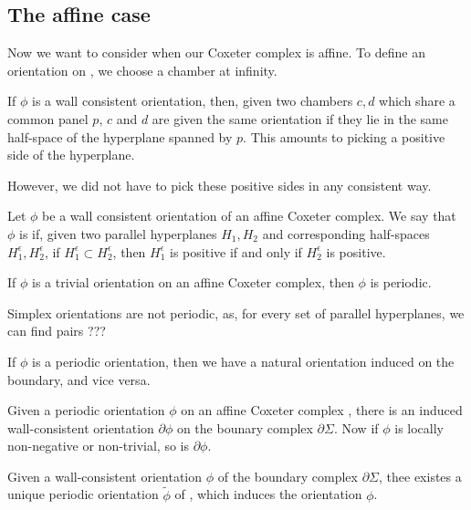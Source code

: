 \documentclass[11pt]{article}
\begin{document}
\subsection{The affine case}

Now we want to consider when our Coxeter complex \sg is affine. To define an orientation on \sg, we choose a chamber at infinity.

If $\phi$ is a wall consistent orientation, then, given two chambers $c,d$ which share a common panel $p$, $c$ and $d$ are given the same orientation if they lie in the same half-space of the hyperplane spanned by $p$. This amounts to picking a positive side of the hyperplane.

However, we did not have to pick these positive sides in any consistent way. 

\begin{definition}
    Let $\phi$ be a wall consistent orientation of an affine Coxeter complex. We say that $\phi$ is  if, given two parallel hyperplanes $H_1,H_2$ and corresponding half-spaces $H_1^{\epsilon},H_2^{\epsilon}$, if $H_1^{\epsilon}\subset H_2^{\epsilon}$, then $H_1^{\epsilon}$ is positive if and only if $H_2^{\epsilon}$ is positive. 
\end{definition}

\begin{example}
    If $\phi$ is a trivial orientation on an affine Coxeter complex, then $\phi$ is periodic. 
\end{example}

\begin{example}
    Simplex orientations are not periodic, as, for every set of parallel hyperplanes, we can find pairs ???
\end{example}

If $\phi$ is a periodic orientation, then we have a natural orientation induced on the boundary, and vice versa. 

\begin{lemma}
    Given a periodic orientation $\phi$ on an affine Coxeter complex \sg, there is an induced wall-consistent orientation $\partial\phi$ on the bounary complex $\partial\Sigma$. Now if $\phi$ is locally non-negative or non-trivial, so is $\partial\phi$. 
\end{lemma}

\begin{lemma}
    Given a wall-consistent orientation $\phi$ of the boundary complex $\partial\Sigma$, thee existes a unique periodic orientation $\tilde{\phi}$ of \sg, which induces the orientation $\phi$. 
\end{lemma}
\end{document}
